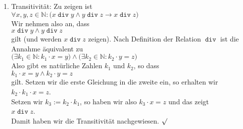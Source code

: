 \begin{enumerate}
      \\[0.2cm]
      \hspace*{1.3cm}
      $k_1 \cdot x = y \wedge k_2 \cdot y = x$
      \\[0.2cm]
      gilt.  Setzen wir diese Gleichungen ineinander ein, so erhalten wir 
      \\[0.2cm]
      \hspace*{1.3cm}
      $k_1 \cdot k_2 \cdot y = y$ \quad und \quad
      $k_2 \cdot k_1 \cdot x = x$.
      \\[0.2cm] 
      Da $x$ und $y$ als nat\"{u}rliche Zahlen von $0$ verschieden sind, muss dann
      \\[0.2cm]
      \hspace*{1.3cm}
      $k_1 \cdot k_2 = 1$
      \\[0.2cm]
      gelten.  Da aus $k_1 \cdot k_2 = 1$ sofort $k_1 = 1$ und $k_2 = 1$ folgt, denn auch $k_1$ und
      $k_2$ sind ja nat\"{u}rliche Zahlen, 
      k\"{o}nnen wir wegen der urspr\"{u}nglichen Gleichungen $k_1 \cdot x = y$ und $k_2 \cdot y = x$
      sofort auf $x = y$ schlie\3en.  Damit ist die Anti-Symmetrie gezeigt. $\surd$
\item Transitivit\"{a}t: Zu zeigen ist 
      \\[0.2cm]
      \hspace*{1.3cm}
      $\forall x, y, z \in \mathbb{N}:\bigl( x \mathop{\mathtt{div}} y \wedge y \mathop{\mathtt{div}} z \rightarrow x \mathop{\mathtt{div}} z\bigr)$
      \\[0.2cm] 
      Wir nehmen also an, dass 
      \\[0.2cm]
      \hspace*{1.3cm}
      $x \mathop{\mathtt{div}} y \wedge y \mathop{\mathtt{div}} z$
      \\[0.2cm]
      gilt (und werden $x \mathop{\mathtt{div}} z$ zeigen).  Nach Definition der Relation $\mathop{\mathtt{div}}$
      ist die Annahme \"{a}quivalent zu 
      \\[0.2cm]
      \hspace*{1.3cm}
      $\bigl(\exists k_1 \in \mathbb{N}: k_1 \cdot x = y \bigr) \wedge
       \bigl(\exists k_2 \in \mathbb{N}: k_2 \cdot y = z \bigr)$ 
      \\[0.2cm]
      Also gibt es nat\"{u}rliche Zahlen $k_1$ und $k_2$, so dass 
      \\[0.2cm]
      \hspace*{1.3cm}
      $k_1 \cdot x = y \wedge k_2 \cdot y = z$
      \\[0.2cm]
      gilt.  Setzen wir die erste Gleichung in die zweite  ein, so erhalten wir 
      \\[0.2cm]
      \hspace*{1.3cm}
      $k_2 \cdot k_1 \cdot x = z$.
      \\[0.2cm] 
      Setzen wir $k_3 := k_2 \cdot k_1$, so haben wir also $k_3 \cdot x = z$
      und das zeigt 
      \\[0.2cm]
      \hspace*{1.3cm}
      $x \mathop{\mathtt{div}} z$.
      \\[0.2cm]
      Damit haben wir die Transitivit\"{a}t nachgewiesen.  $\surd$
\end{enumerate}

